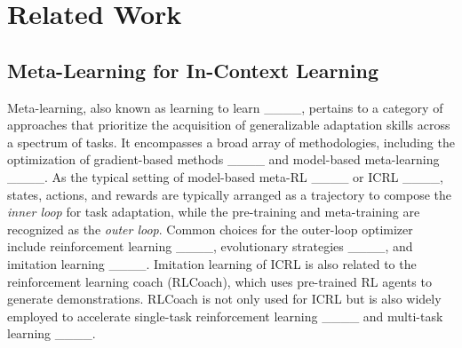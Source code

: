\section{Related Work}
\subsection{Meta-Learning for In-Context Learning}
Meta-learning, also known as learning to learn ____, pertains to a category of approaches that prioritize the acquisition of generalizable adaptation skills across a spectrum of tasks. It encompasses a broad array of methodologies, including the optimization of gradient-based methods ____ and model-based meta-learning ____. As the typical setting of model-based meta-RL ____ or ICRL ____, states, actions, and rewards are typically arranged as a trajectory to compose the \emph{inner loop} for task adaptation, while the pre-training and meta-training are recognized as the \emph{outer loop}. Common choices for the outer-loop optimizer include reinforcement learning ____, evolutionary strategies ____, and imitation learning ____. Imitation learning of ICRL is also related to the reinforcement learning coach (RLCoach), which uses pre-trained RL agents to generate demonstrations. RLCoach is not only used for ICRL but is also widely employed to accelerate single-task reinforcement learning ____ and multi-task learning ____.

